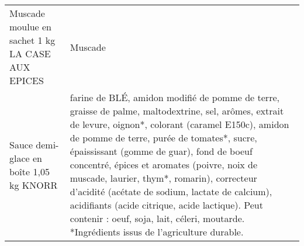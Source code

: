 \begin{longtable}{p{5cm}p{10cm}}
                                                         Muscade moulue en sachet 1 kg LA CASE AUX EPICES &                                                                                                                                                                                                                                                                                                                                                                                                                                                                                                                                                                                                                                                                                                                                                                                                                                                                                                                                                                                                                                  Muscade \\
                                                                  Sauce demi-glace en boîte 1,05 kg KNORR &                                                                                                                                                                                                                                                                                                                                                                                                                                                                                      farine de BLÉ, amidon modifié de pomme de terre, graisse de palme, maltodextrine, sel, arômes, extrait de levure, oignon*, colorant (caramel E150c), amidon de pomme de terre, purée de tomates*, sucre, épaississant (gomme de guar), fond de boeuf concentré, épices et aromates (poivre, noix de muscade, laurier, thym*, romarin), correcteur d'acidité (acétate de sodium, lactate de calcium), acidifiants (acide citrique, acide lactique). Peut contenir : oeuf, soja, lait, céleri, moutarde. *Ingrédients issus de l'agriculture durable. \\

\end{longtable}
